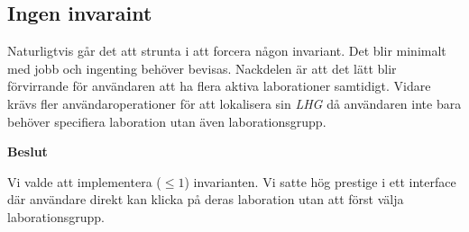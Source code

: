 \subsection{Ingen invaraint}
Naturligtvis går det att strunta i att forcera någon invariant. Det blir minimalt med jobb och ingenting behöver bevisas. Nackdelen är att det lätt blir förvirrande för användaren att ha flera aktiva laborationer samtidigt. Vidare krävs fler användaroperationer för att lokalisera sin \emph{LHG} då användaren inte bara behöver specifiera laboration utan även laborationsgrupp.

\begin{flushright}
  
  \textbf{Beslut}
  
  Vi valde att implementera ($\leq 1$) invarianten. Vi satte hög prestige i ett interface där användare direkt kan klicka på deras laboration utan att först välja laborationsgrupp.
\end{flushright}
